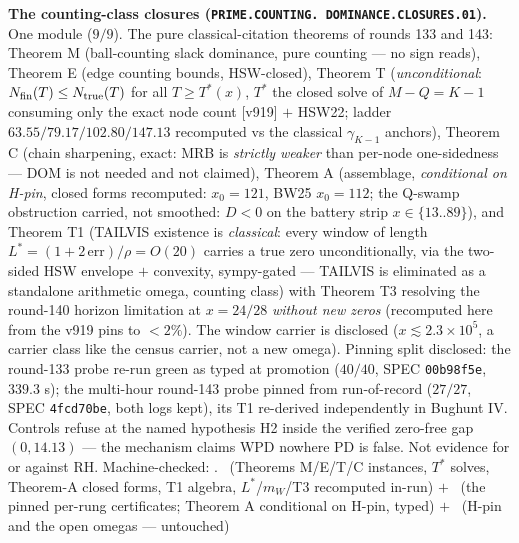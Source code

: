 \documentclass[11pt,a4paper]{article}
\theoremstyle{definition}
\begin{document}
\par\smallskip\noindent\textbf{The counting-class closures
(\texttt{PRIME.\allowbreak COUNTING.\allowbreak
DOMINANCE.\allowbreak CLOSURES.01}).}
One module ($9/9$).  The pure classical-citation theorems of
rounds 133 and 143: Theorem M (ball-counting slack dominance,
pure counting --- no sign reads), Theorem E (edge counting
bounds, HSW-closed), Theorem T (\emph{unconditional}:
$N_{\rm fin}(T) \le N_{\rm true}(T)$ for all $T \ge T^*(x)$,
$T^*$ the closed solve of $M - Q = K - 1$ consuming only the
exact node count [v919] $+$ HSW22; ladder
$63.55/79.17/102.80/147.13$ recomputed vs the classical
$\gamma_{K-1}$ anchors), Theorem C (chain sharpening, exact:
MRB is \emph{strictly weaker} than per-node one-sidedness ---
DOM is not needed and not claimed), Theorem A (assemblage,
\emph{conditional on H-pin}, closed forms recomputed: $x_0 =
121$, BW25 $x_0 = 112$; the Q-swamp obstruction carried, not
smoothed: $D < 0$ on the battery strip $x \in \{13..89\}$), and
Theorem T1 (TAILVIS existence is \emph{classical}: every window
of length $L^* = (1 + 2\,\mathrm{err})/\rho = O(20)$ carries a
true zero unconditionally, via the two-sided HSW envelope $+$
convexity, sympy-gated --- TAILVIS is eliminated as a standalone
arithmetic omega, counting class) with Theorem T3 resolving the
round-140 horizon limitation at $x = 24/28$ \emph{without new
zeros} (recomputed here from the v919 pins to $< 2\%$).  The
window carrier is disclosed ($x \lesssim 2.3\times10^5$, a
carrier class like the census carrier, not a new omega).
Pinning split disclosed: the round-133 probe re-run green as
typed at promotion ($40/40$, SPEC \texttt{00b98f5e}, $339.3$ s);
the multi-hour round-143 probe pinned from run-of-record
($27/27$, SPEC \texttt{4fcd70be}, both logs kept), its T1
re-derived independently in Bughunt IV.  Controls refuse at the
named hypothesis H2 inside the verified zero-free gap
$(0, 14.13)$ --- the mechanism claims WPD nowhere PD is false.
Not evidence for or against RH.
Machine-checked: .
\mE\ (Theorems M/E/T/C instances, $T^*$ solves, Theorem-A closed
forms, T1 algebra, $L^*$/$m_W$/T3 recomputed in-run) $+$ \mC\
(the pinned per-rung certificates; Theorem A conditional on
H-pin, typed) $+$ \mO\ (H-pin and the open omegas --- untouched)
\par\smallskip
\end{document}
